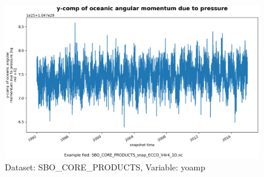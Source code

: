 \begin{figure}[H]
\centering
\includegraphics[scale=0.55]{../images/plots/oneD_plots/SBO_Core_Products/yoamp.png}
\caption{Dataset: SBO\_CORE\_PRODUCTS, Variable: yoamp}
\label{tab:table-SBO_CORE_PRODUCTS_yoamp-Plot}
\end{figure}
\pagebreak

